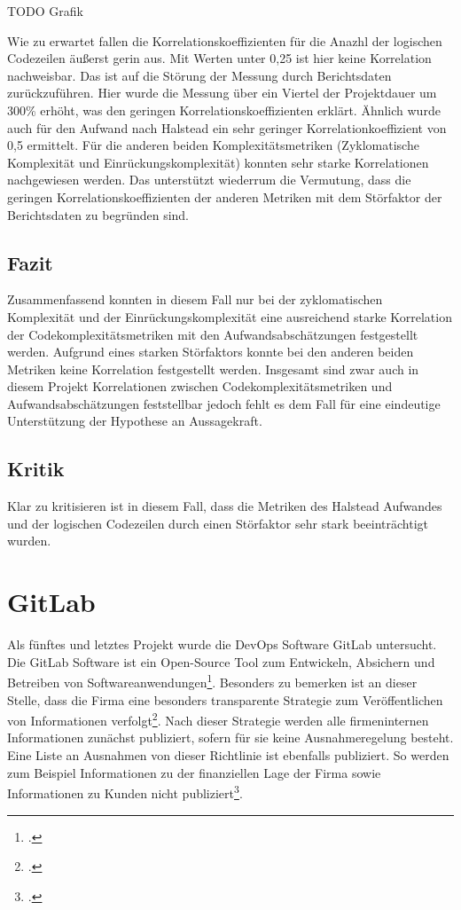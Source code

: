 TODO Grafik

Wie zu erwartet fallen die Korrelationskoeffizienten für die Anazhl der
logischen Codezeilen äußerst gerin aus. Mit Werten unter 0,25 ist hier
keine Korrelation nachweisbar. Das ist auf die Störung der Messung durch
Berichtsdaten zurückzuführen. Hier wurde die Messung über ein Viertel
der Projektdauer um 300\% erhöht, was den geringen
Korrelationskoeffizienten erklärt. Ähnlich wurde auch für den Aufwand
nach Halstead ein sehr geringer Korrelationkoeffizient von 0,5
ermittelt. Für die anderen beiden Komplexitätsmetriken (Zyklomatische
Komplexität und Einrückungskomplexität) konnten sehr starke
Korrelationen nachgewiesen werden. Das unterstützt wiederrum die
Vermutung, dass die geringen Korrelationskoeffizienten der anderen
Metriken mit dem Störfaktor der Berichtsdaten zu begründen sind.

\subsection{Fazit}\label{engelmanii-fazit}

Zusammenfassend konnten in diesem Fall nur bei der zyklomatischen
Komplexität und der Einrückungskomplexität eine ausreichend starke
Korrelation der Codekomplexitätsmetriken mit den Aufwandsabschätzungen
festgestellt werden. Aufgrund eines starken Störfaktors konnte bei den
anderen beiden Metriken keine Korrelation festgestellt werden. Insgesamt
sind zwar auch in diesem Projekt Korrelationen zwischen
Codekomplexitätsmetriken und Aufwandsabschätzungen feststellbar jedoch
fehlt es dem Fall für eine eindeutige Unterstützung der Hypothese an
Aussagekraft.

\subsection{Kritik}\label{engelmanii-kritik}

Klar zu kritisieren ist in diesem Fall, dass die Metriken des Halstead
Aufwandes und der logischen Codezeilen durch einen Störfaktor sehr stark
beeinträchtigt wurden.

\section{GitLab}\label{GitLab}

Als fünftes und letztes Projekt wurde die DevOps Software GitLab
untersucht. Die GitLab Software ist ein Open-Source Tool zum Entwickeln,
Absichern und Betreiben von Softwareanwendungen\footcite[Vgl. ][]{GitLab14Delivers2021}.
Besonders zu bemerken ist an dieser Stelle, dass die Firma eine
besonders transparente Strategie zum Veröffentlichen von Informationen
verfolgt\footcite[Vgl. ][]{GitLabValues}. Nach dieser Strategie werden alle
firmeninternen Informationen zunächst publiziert, sofern für sie keine
Ausnahmeregelung besteht. Eine Liste an Ausnahmen von dieser Richtlinie
ist ebenfalls publiziert. So werden zum Beispiel Informationen zu der
finanziellen Lage der Firma sowie Informationen zu Kunden nicht
publiziert\footcite[Vgl. ][]{GitLabCommunication}.

